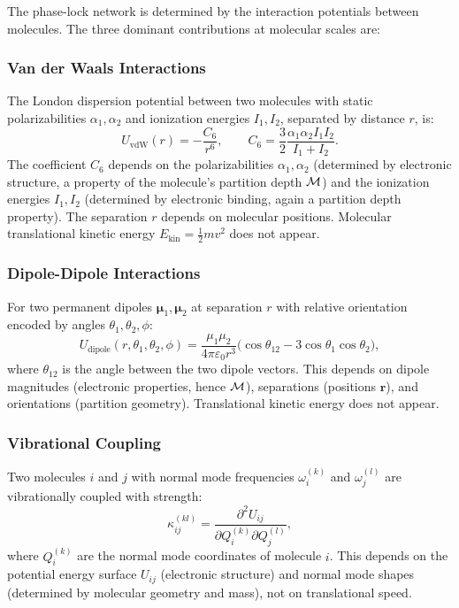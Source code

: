 The phase-lock network is determined by the interaction potentials between
molecules. The three dominant contributions at molecular scales are:

\subsubsection{Van der Waals Interactions}

The London dispersion potential between two molecules with static polarizabilities
$\alpha_1, \alpha_2$ and ionization energies $I_1, I_2$, separated by distance
$r$, is:
\begin{equation}
  U_{\mathrm{vdW}}(r) = -\frac{C_6}{r^6}, \qquad
  C_6 = \frac{3}{2} \frac{\alpha_1 \alpha_2 I_1 I_2}{I_1 + I_2}.
  \label{eq:vdw}
\end{equation}
The coefficient $C_6$ depends on the polarizabilities $\alpha_1, \alpha_2$
(determined by electronic structure, a property of the molecule's partition
depth $\mathcal{M}$) and the ionization energies $I_1, I_2$ (determined by
electronic binding, again a partition depth property). The separation $r$
depends on molecular positions. Molecular translational kinetic energy $E_{\mathrm{kin}} = \frac{1}{2}mv^2$
does not appear.

\subsubsection{Dipole-Dipole Interactions}

For two permanent dipoles $\boldsymbol{\mu}_1, \boldsymbol{\mu}_2$ at separation
$r$ with relative orientation encoded by angles $\theta_1, \theta_2, \phi$:
\begin{equation}
  U_{\mathrm{dipole}}(r, \theta_1, \theta_2, \phi) =
  \frac{\mu_1 \mu_2}{4\pi\varepsilon_0 r^3}
  \bigl(\cos\theta_{12} - 3\cos\theta_1\cos\theta_2\bigr),
  \label{eq:dipole}
\end{equation}
where $\theta_{12}$ is the angle between the two dipole vectors. This depends
on dipole magnitudes (electronic properties, hence $\mathcal{M}$), separations
(positions $\mathbf{r}$), and orientations (partition geometry). Translational
kinetic energy does not appear.

\subsubsection{Vibrational Coupling}

Two molecules $i$ and $j$ with normal mode frequencies $\omega_i^{(k)}$ and
$\omega_j^{(l)}$ are vibrationally coupled with strength:
\begin{equation}
  \kappa_{ij}^{(kl)} = \frac{\partial^2 U_{ij}}{\partial Q_i^{(k)} \partial Q_j^{(l)}},
  \label{eq:vib_coupling}
\end{equation}
where $Q_i^{(k)}$ are the normal mode coordinates of molecule $i$. This depends
on the potential energy surface $U_{ij}$ (electronic structure) and normal mode
shapes (determined by molecular geometry and mass), not on translational speed.

